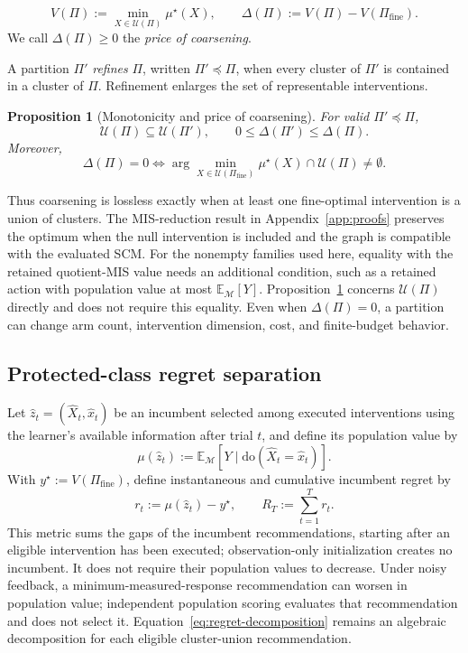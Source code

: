 \documentclass[twoside]{article}
\newtheorem{proposition}{Proposition}
\newcommand{\E}{\mathbb{E}}
\newcommand{\doo}{\mathrm{do}}
\begin{document}
\begin{equation}
 V(\Pi):=\min_{X\in\mathcal U(\Pi)}\mu^\star(X),
 \qquad
 \Delta(\Pi):=V(\Pi)-V(\Pi_{\mathrm{fine}}).
 \label{eq:price}
\end{equation}
We call \(\Delta(\Pi)\ge0\) the \emph{price of coarsening}.
 
A partition \(\Pi'\) \emph{refines} \(\Pi\), written \(\Pi'\preceq\Pi\), when every cluster of \(\Pi'\) is contained in a cluster of \(\Pi\). Refinement enlarges the set of representable interventions.

\begin{proposition}[Monotonicity and price of coarsening]
\label{prop:price}
For valid $\Pi'\preceq\Pi$,
\[
 \mathcal U(\Pi)\subseteq\mathcal U(\Pi'),
 \qquad
 0\le\Delta(\Pi')\le\Delta(\Pi).
\]
Moreover,
\[
 \Delta(\Pi)=0
 \iff
 \arg\min_{X\in\mathcal U(\Pi_{\mathrm{fine}})}\mu^\star(X)
 \cap\mathcal U(\Pi)\ne\emptyset.
\]
\end{proposition}

Thus coarsening is lossless exactly when at least one fine-optimal intervention is a union of clusters. The MIS-reduction result in Appendix~\ref{app:proofs} preserves the optimum when the null intervention is included and the graph is compatible with the evaluated SCM. For the nonempty families used here, equality with the retained quotient-MIS value needs an additional condition, such as a retained action with population value at most \(\E_{\mathcal M}[Y]\). Proposition~\ref{prop:price} concerns \(\mathcal U(\Pi)\) directly and does not require this equality. Even when \(\Delta(\Pi)=0\), a partition can change arm count, intervention dimension, cost, and finite-budget behavior.

\subsection{Protected-class regret separation}
\label{sec:separation}


Let \(\hat z_t=(\hat X_t,\hat x_t)\) be an incumbent selected among executed interventions using the learner's available information after trial \(t\), and define its population value by
\[
 \mu(\hat z_t):=\E_{\mathcal M}
 [Y\mid\doo(\hat X_t=\hat x_t)].
 \]
With \(y^\star:=V(\Pi_{\mathrm{fine}})\), define instantaneous and cumulative incumbent regret by
\begin{equation}
 r_t:=\mu(\hat z_t)-y^\star,
 \qquad
 R_T:=\sum_{t=1}^{T}r_t.
 \label{eq:regret}
\end{equation}
This metric sums the gaps of the incumbent recommendations, starting after an eligible intervention has been executed; observation-only initialization creates no incumbent. It does not require their population values to decrease. Under noisy feedback, a minimum-measured-response recommendation can worsen in population value; independent population scoring evaluates that recommendation and does not select it. Equation~\eqref{eq:regret-decomposition} remains an algebraic decomposition for each eligible cluster-union recommendation.
\end{document}
